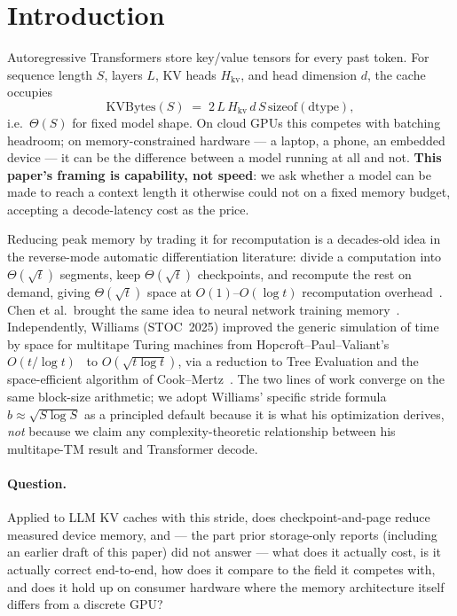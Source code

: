 \documentclass[11pt]{article}
\begin{document}
\section{Introduction}

Autoregressive Transformers store key/value tensors for every past token.
For sequence length $S$, layers $L$, KV heads $H_{\mathrm{kv}}$, and head
dimension $d$, the cache occupies
\begin{equation}
  \mathrm{KVBytes}(S)
  \;=\;
  2\, L\, H_{\mathrm{kv}}\, d\, S\, \mathrm{sizeof}(\mathrm{dtype}),
\end{equation}
i.e.\ $\Theta(S)$ for fixed model shape. On cloud GPUs this competes with
batching headroom; on memory-constrained hardware --- a laptop, a phone, an
embedded device --- it can be the difference between a model running at all
and not. \textbf{This paper's framing is capability, not speed}: we ask
whether a model can be made to reach a context length it otherwise could
not on a fixed memory budget, accepting a decode-latency cost as the price.

Reducing peak memory by trading it for recomputation is a decades-old idea
in the reverse-mode automatic differentiation literature: divide a
computation into $\Theta(\sqrt{t})$ segments, keep $\Theta(\sqrt{t})$
checkpoints, and recompute the rest on demand, giving
$\Theta(\sqrt{t})$ space at $O(1)$--$O(\log t)$ recomputation
overhead~\cite{griewank2000revolve}. Chen et al.\ brought the same idea to
neural network training memory~\cite{chen2016checkpoint}. Independently,
Williams (STOC~2025) improved the generic simulation of time by space for
multitape Turing machines from Hopcroft--Paul--Valiant's
$O(t/\log t)$~\cite{hpv1977} to $O(\sqrt{t\log t})$, via a reduction to Tree
Evaluation and the space-efficient algorithm of
Cook--Mertz~\cite{cookmertz2024}. The two lines of work converge on the same
block-size arithmetic; we adopt Williams' specific stride formula
$b\approx\sqrt{S\log S}$ as a principled default because it is what his
optimization derives, \emph{not} because we claim any complexity-theoretic
relationship between his multitape-TM result and Transformer decode.

\paragraph{Question.} Applied to LLM KV caches with this stride, does
checkpoint-and-page reduce measured device memory, and --- the part prior
storage-only reports (including an earlier draft of this paper) did not
answer --- what does it actually cost, is it actually correct end-to-end,
how does it compare to the field it competes with, and does it hold up on
consumer hardware where the memory architecture itself differs from a
discrete GPU?
\end{document}
